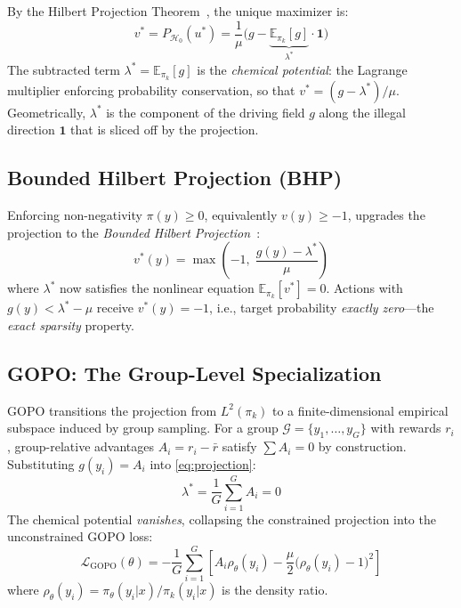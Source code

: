 \documentclass[11pt]{article}
\theoremstyle{definition}
\theoremstyle{remark}
\newcommand{\E}{\mathbb{E}}
\newcommand{\loss}{\mathcal{L}}
\newcommand{\pik}{\pi_k}
\begin{document}
By the Hilbert Projection Theorem~\cite{Wang2025OPO}, the unique maximizer is:
\begin{equation}
\label{eq:projection}
    v^* = P_{\mathcal{H}_0}(u^*) = \frac{1}{\mu}\big(g - \underbrace{\E_{\pik}[g]}_{\lambda^*} \cdot \mathbf{1}\big)
\end{equation}
The subtracted term $\lambda^* = \E_{\pik}[g]$ is the \emph{chemical potential}: the Lagrange multiplier enforcing probability conservation, so that $v^* = (g - \lambda^*)/\mu$. Geometrically, $\lambda^*$ is the component of the driving field $g$ along the illegal direction $\mathbf{1}$ that is sliced off by the projection.

\subsection{Bounded Hilbert Projection (BHP)}

Enforcing non-negativity $\pi(y) \geq 0$, equivalently $v(y) \geq -1$, upgrades the projection to the \emph{Bounded Hilbert Projection}~\cite{Wang2025GOPO}:
\begin{equation}
\label{eq:bhp}
    v^*(y) = \max\!\left(-1,\; \frac{g(y) - \lambda^*}{\mu}\right)
\end{equation}
where $\lambda^*$ now satisfies the nonlinear equation $\E_{\pik}[v^*] = 0$. Actions with $g(y) < \lambda^* - \mu$ receive $v^*(y) = -1$, i.e., target probability \emph{exactly zero}---the \emph{exact sparsity} property.

\subsection{GOPO: The Group-Level Specialization}

GOPO transitions the projection from $L^2(\pik)$ to a finite-dimensional empirical subspace induced by group sampling. For a group $\mathcal{G} = \{y_1, \ldots, y_G\}$ with rewards $r_i$, group-relative advantages $A_i = r_i - \bar{r}$ satisfy $\sum A_i = 0$ by construction. Substituting $g(y_i) = A_i$ into \cref{eq:projection}:
\begin{equation}
    \lambda^* = \frac{1}{G}\sum_{i=1}^G A_i = 0
\end{equation}
The chemical potential \emph{vanishes}, collapsing the constrained projection into the unconstrained GOPO loss:
\begin{equation}
\label{eq:gopo_loss}
    \loss_{\text{GOPO}}(\theta) = -\frac{1}{G}\sum_{i=1}^G \left[ A_i \rho_\theta(y_i) - \frac{\mu}{2}\big(\rho_\theta(y_i) - 1\big)^2 \right]
\end{equation}
where $\rho_\theta(y_i) = \pi_\theta(y_i|x)/\pik(y_i|x)$ is the density ratio.
\end{document}
